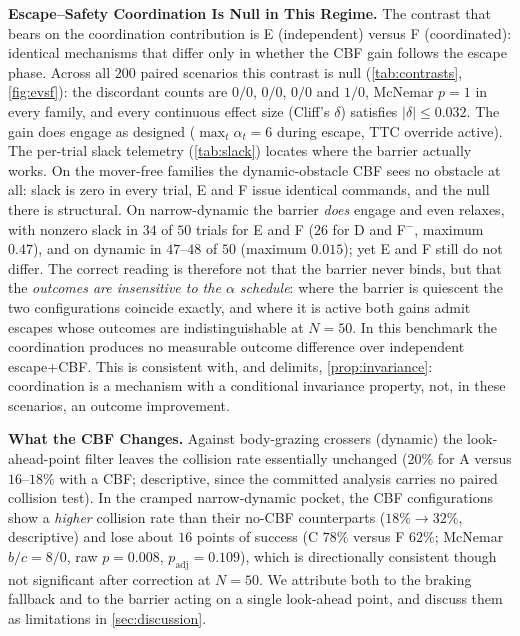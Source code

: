 \noindent\textbf{Escape--Safety Coordination Is Null in This Regime.} The contrast that bears on the coordination contribution is E (independent) versus F (coordinated): identical mechanisms that differ only in whether the CBF gain follows the escape phase. Across all $200$ paired scenarios this contrast is null (\cref{tab:contrasts}, \cref{fig:evsf}): the discordant counts are $0/0$, $0/0$, $0/0$ and $1/0$, McNemar $p=1$ in every family, and every continuous effect size (Cliff's $\delta$) satisfies $|\delta|\le0.032$. The gain does engage as designed ($\max_t\alpha_t=6$ during escape, TTC override active). The per-trial slack telemetry (\cref{tab:slack}) locates where the barrier actually works. On the mover-free families the dynamic-obstacle CBF sees no obstacle at all: slack is zero in every trial, E and F issue identical commands, and the null there is structural. On narrow-dynamic the barrier \emph{does} engage and even relaxes, with nonzero slack in $34$ of $50$ trials for E and F ($26$ for D and F$^{-}$, maximum $0.47$), and on dynamic in $47$--$48$ of $50$ (maximum $0.015$); yet E and F still do not differ. The correct reading is therefore not that the barrier never binds, but that the \emph{outcomes are insensitive to the $\alpha$ schedule}: where the barrier is quiescent the two configurations coincide exactly, and where it is active both gains admit escapes whose outcomes are indistinguishable at $N=50$. In this benchmark the coordination produces no measurable outcome difference over independent escape+CBF. This is consistent with, and delimits, \cref{prop:invariance}: coordination is a mechanism with a conditional invariance property, not, in these scenarios, an outcome improvement.



\noindent\textbf{What the CBF Changes.} Against body-grazing crossers (dynamic) the look-ahead-point filter leaves the collision rate essentially unchanged ($20\%$ for A versus $16$--$18\%$ with a CBF; descriptive, since the committed analysis carries no paired collision test). In the cramped narrow-dynamic pocket, the CBF configurations show a \emph{higher} collision rate than their no-CBF counterparts ($18\%\to32\%$, descriptive) and lose about $16$ points of success (C $78\%$ versus F $62\%$; McNemar $b/c=8/0$, raw $p=0.008$, $p_{\mathrm{adj}}=0.109$), which is directionally consistent though not significant after correction at $N=50$. We attribute both to the braking fallback and to the barrier acting on a single look-ahead point, and discuss them as limitations in \cref{sec:discussion}.

